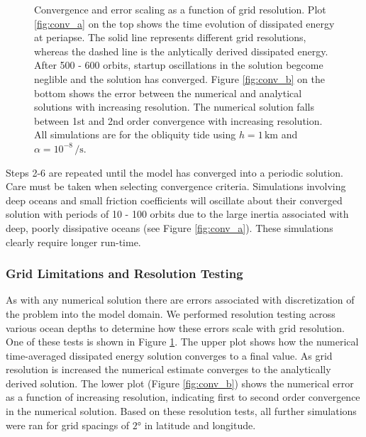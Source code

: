 \begin{figure}[!t]
\begin{subfigure}{\linewidth}
\subcaption{\label{fig:conv_b}}
\end{subfigure}\vspace*{-0.7cm}
\caption{Convergence and error scaling as a function of grid resolution. Plot \ref{fig:conv_a} on the top shows the time evolution of dissipated energy at periapse. The solid line represents different grid resolutions, whereas the dashed line is the anlytically derived dissipated energy. After 500 - 600 orbits, startup oscillations in the solution begcome neglible and the solution has converged. Figure \ref{fig:conv_b} on the bottom shows the error between the numerical and analytical solutions with increasing resolution. The numerical solution falls between 1st and 2nd order convergence with increasing resolution. All simulations are for the obliquity tide using $h = 1 \, \si{\kilo\metre}$ and $\alpha = 10^{-8} \, \si{\per\second}$. \label{fig:conv}}
\end{figure}

Steps 2-6 are repeated until the model has converged into a periodic solution. Care must be taken when selecting convergence criteria. Simulations involving deep oceans and small friction coefficients will oscillate about their converged solution with periods of 10 - 100 orbits due to the large inertia associated with deep, poorly dissipative oceans (see Figure \ref{fig:conv_a}). These simulations clearly require longer run-time.


\subsubsection{Grid Limitations and Resolution Testing \label{subsubsec:grid_lim}}

As with any numerical solution there are errors associated with discretization of the problem into the model domain. We performed resolution testing across various ocean depths to determine how these errors scale with grid resolution. One of these tests is shown in Figure \ref{fig:conv}. The upper plot shows how the numerical time-averaged dissipated energy solution converges to a final value. As grid resolution is increased the numerical estimate converges to the analytically derived solution. The lower plot (Figure \ref{fig:conv_b}) shows the numerical error as a function of increasing resolution, indicating first to second order convergence in the numerical solution. Based on these resolution tests, all further simulations were ran for grid spacings of $\ang{2}$ in latitude and longitude. 


